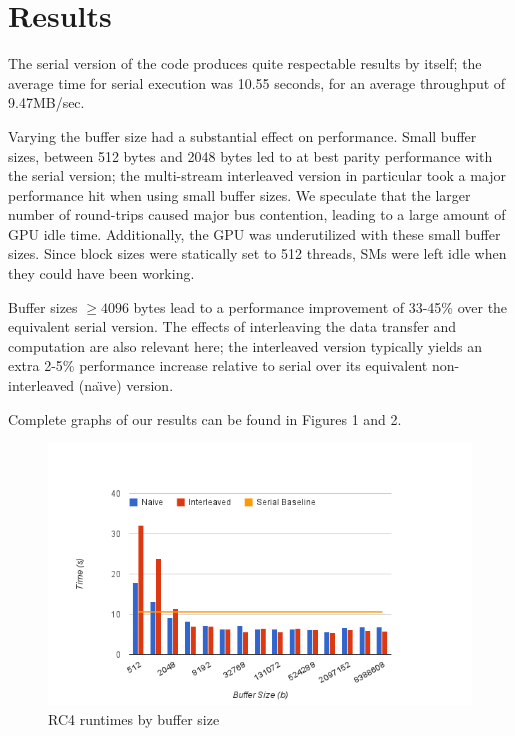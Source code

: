 \documentclass[twocolumn]{article}
\begin{document}
  \section{Results}
  
  The serial version of the code produces quite respectable results by itself; the average time for serial execution was 10.55 seconds, for an average throughput of 9.47MB/sec.
  
  Varying the buffer size had a substantial effect on performance. Small buffer sizes, between 512 bytes and 2048 bytes led to at best parity performance with the serial version; the multi-stream interleaved version in particular took a major performance hit when using small buffer sizes. We speculate that the larger number of round-trips caused major bus contention, leading to a large amount of GPU idle time. Additionally, the GPU was underutilized with these small buffer sizes. Since block sizes were statically set to 512 threads, SMs were left idle when they could have been working.
  
  Buffer sizes $\ge 4096$ bytes lead to a performance improvement of 33-45\% over the equivalent serial version. The effects of interleaving the data transfer and computation are also relevant here; the interleaved version typically yields an extra 2-5\% performance increase relative to serial over its equivalent non-interleaved (na\"\i ve) version.
  
  Complete graphs of our results can be found in Figures 1 and 2.
  
  \begin{figure}
    \includegraphics[width=\columnwidth]{averageruntimes}
    \caption{RC4 runtimes by buffer size}
  \end{figure}
  
\end{document}
